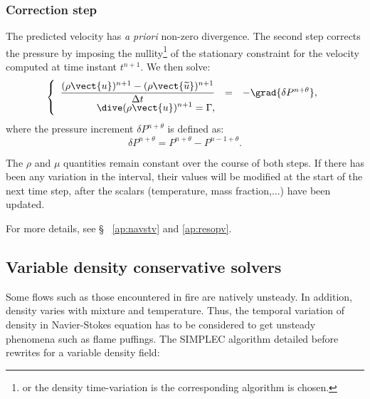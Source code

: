 \subsubsection{Correction step}
The predicted velocity has \emph{a priori} non-zero divergence. The second step
corrects the pressure by imposing the nullity\footnote{or the density time-variation
is the corresponding algorithm is chosen.}
of the stationary constraint for
the velocity computed at time instant ${t^{n+1}}$.
We then solve:
\begin{equation}\label{eq:timstp:c0_correction_step}
\left\{\begin{array}{ r c l}
\displaystyle \dfrac{(\rho\vect{u})^{n+1}-(\rho\vect{\widetilde{u}})^{n+1}}{\Delta t} &=&
-\grad{\delta P^{n+\theta}} ,\\
\displaystyle
\dive(\rho\vect{u})^{n+1} = \Gamma ,\\
\end{array}\right.
\end{equation}
where the pressure increment $\delta P^{n+\theta}$ is defined as:
\begin{equation}
\delta P^{n+\theta}=P^{n+\theta}-P^{n-1+\theta} .
\end{equation}

\begin{remark}
The  $\rho$ and $\mu$ quantities remain constant over the course of both
steps. If there has been any variation in the interval, their values will be
modified at the start of the next time step, after the scalars
(temperature, mass fraction,...) have been updated.
\end{remark}


For more details, see \S~ \ref{ap:navstv} and \ref{ap:resopv}.

\subsection{Variable density conservative solvers}

Some flows such as those encountered in fire are natively unsteady.
In addition, density varies with mixture and temperature. Thus, the temporal
variation of density in Navier-Stokes equation has to be considered to get
unsteady phenomena such as flame puffings.
The SIMPLEC algorithm detailed before rewrites for a variable density field:

